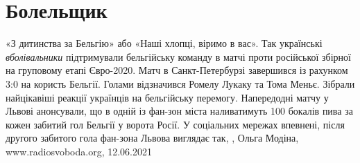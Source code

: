  
 
 
 
 
\chapter{Болельщик}
\label{sec:slova.bolelschik}

«З дитинства за Бельгію» або «Наші хлопці, віримо в вас». Так українські
\emph{вболівальники} підтримували бельгійську команду в матчі проти російської
збірної на груповому етапі Євро-2020. Матч в Санкт-Петербурзі завершився із
рахунком 3:0 на користь Бельгії. Голами відзначився Ромелу Лукаку та Тома
Меньє. Зібрали найцікавіші реакції українців на бельгійську перемогу.
Напередодні матчу у Львові анонсували, що в одній із фан-зон міста наливатимуть
100 бокалів пива за кожен забитий гол Бельгії у ворота Росії. У соціальних
мережах впевнені, після другого забитого гола фан-зона Львова виглядає так,
, Ольга Модіна, www.radiosvoboda.org, 12.06.2021

